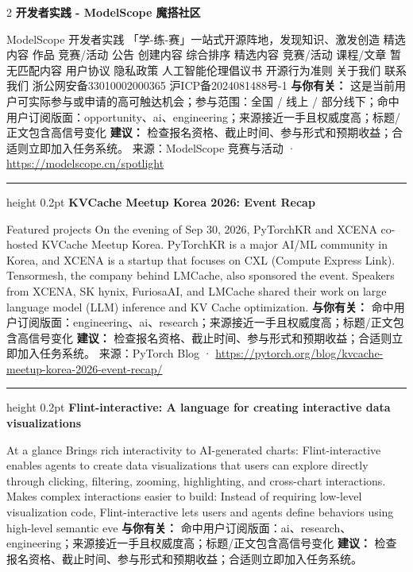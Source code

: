 \documentclass[10.5pt]{ctexart}
\begin{document}
\begin{multicols}{2}
{\large\bfseries 开发者实践 - ModelScope 魔搭社区}\par
ModelScope 开发者实践 「学-练-赛」一站式开源阵地，发现知识、激发创造 精选内容 作品 竞赛/活动 公告 创建内容 综合排序 精选内容 竞赛/活动 课程/文章 暂无匹配内容 用户协议 隐私政策 人工智能伦理倡议书 开源行为准则 关于我们 联系我们 浙公网安备33010002000365 沪ICP备2024081488号-1
\textbf{与你有关：} 这是当前用户可实际参与或申请的高可触达机会；参与范围：全国 / 线上 / 部分线下；命中用户订阅版面：opportunity、ai、engineering；来源接近一手且权威度高；标题/正文包含高信号变化
\textbf{建议：} 检查报名资格、截止时间、参与形式和预期收益；合适则立即加入任务系统。
{\footnotesize\color{ormuted} 来源：ModelScope 竞赛与活动 · \url{https://modelscope.cn/spotlight}}
\vspace{2mm}
\hrule height 0.2pt
\vspace{2mm}
{\large\bfseries KVCache Meetup Korea 2026: Event Recap}\par
Featured projects On the evening of Sep 30, 2026, PyTorchKR and XCENA co-hosted KVCache Meetup Korea. PyTorchKR is a major AI/ML community in Korea, and XCENA is a startup that focuses on CXL (Compute Express Link). Tensormesh, the company behind LMCache, also sponsored the event. Speakers from XCENA, SK hynix, FuriosaAI, and LMCache shared their work on large language model (LLM) inference and KV Cache optimization.
\textbf{与你有关：} 命中用户订阅版面：engineering、ai、research；来源接近一手且权威度高；标题/正文包含高信号变化
\textbf{建议：} 检查报名资格、截止时间、参与形式和预期收益；合适则立即加入任务系统。
{\footnotesize\color{ormuted} 来源：PyTorch Blog · \url{https://pytorch.org/blog/kvcache-meetup-korea-2026-event-recap/}}
\vspace{2mm}
\hrule height 0.2pt
\vspace{2mm}
{\large\bfseries Flint-interactive: A language for creating interactive data visualizations}\par
At a glance Brings rich interactivity to AI-generated charts: Flint-interactive enables agents to create data visualizations that users can explore directly through clicking, filtering, zooming, highlighting, and cross-chart interactions. Makes complex interactions easier to build: Instead of requiring low-level visualization code, Flint-interactive lets users and agents define behaviors using high-level semantic eve
\textbf{与你有关：} 命中用户订阅版面：ai、research、engineering；来源接近一手且权威度高；标题/正文包含高信号变化
\textbf{建议：} 检查报名资格、截止时间、参与形式和预期收益；合适则立即加入任务系统。

\end{multicols}
\end{document}
